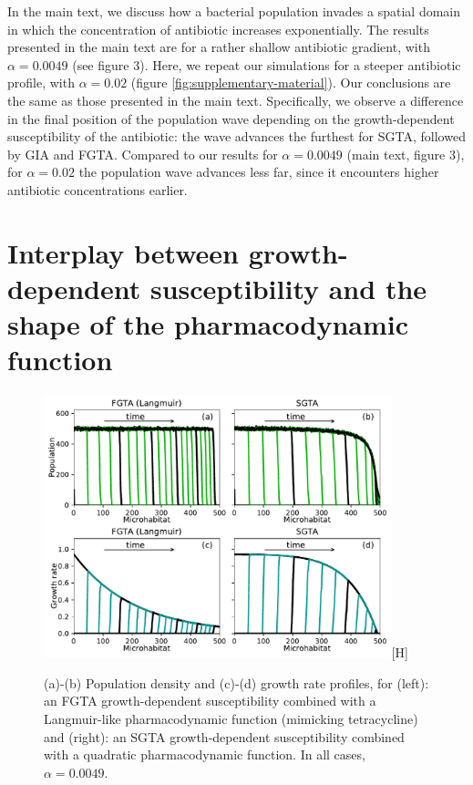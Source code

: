 \documentclass[a4paper]{article}
\begin{document}
In the main text, we discuss how a bacterial population invades a spatial domain in which the concentration of antibiotic increases exponentially. The results presented in the main text are for a rather shallow antibiotic gradient, with $\alpha=0.0049$ (see figure 3). Here, we repeat our simulations for a steeper antibiotic profile, with 
$\alpha=0.02$ (figure \ref{fig:supplementary-material}). Our conclusions are the same as those presented in the main text. Specifically, we observe a difference in the final position of the population wave depending on the growth-dependent susceptibility of the antibiotic: the wave advances the furthest for SGTA, followed by GIA and FGTA. Compared to our results for 
$\alpha=0.0049$ (main text, figure 3), for $\alpha=0.02$ the population wave advances less far, since it encounters higher antibiotic concentrations earlier. 


\section*{Interplay between growth-dependent susceptibility and the shape of the pharmacodynamic function}

\begin{figure}
\centering
\includegraphics[width=0.9\textwidth]{supplementary_realistic_simple_comparison}[H]
\caption{(a)-(b) Population density and (c)-(d) growth rate profiles, for (left): an FGTA growth-dependent susceptibility combined with a Langmuir-like pharmacodynamic function (mimicking tetracycline) and (right): an SGTA growth-dependent susceptibility combined with a quadratic pharmacodynamic function. In all cases, $\alpha=0.0049$.} \label{fig:supplementary-material-real-simple-compare}
\end{figure}
\end{document}
